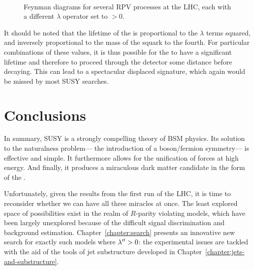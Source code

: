 

\begin{figure}
\centering
{}
\\
\label{fig:susy:rpv_diagrams}
\caption{Feynman diagrams for several RPV processes at the LHC, each with a different $\lambda$ operator set to $>0$.}
\end{figure}


It should be noted that the lifetime of the \lsp is proportional to the $\lambda$ terms squared, and inversely proportional to the mass of the squark to the fourth. For particular combinations of these values, it is thus possible for the \lsp to have a significant lifetime and therefore to proceed through the detector some distance before decaying. This can lead to a spectacular displaced signature, which again would be missed by most SUSY searches.  


\section{Conclusions}

In summary, SUSY is a strongly compelling theory of BSM physics. Its solution to the naturalness problem--- the introduction of a boson/fermion symmetry--- is effective and simple. It furthermore allows for the unification of forces at high energy. And finally, it produces a miraculous dark matter candidate in the form of the \lsp.

Unfortunately, given the results from the first run of the LHC, it is time to reconsider whether we can have all three miracles at once. The least explored space of possibilities exist in the realm of $R$-parity violating models, which have been largely unexplored because of the difficult signal discrimination and background estimation. Chapter~\ref{chapter:search} presents an innovative new search for exactly such models where $\lambda^{\prime\prime} > 0$: the experimental issues are tackled with the aid of the tools of jet substructure developed in Chapter~\ref{chapter:jets-and-substructure}.